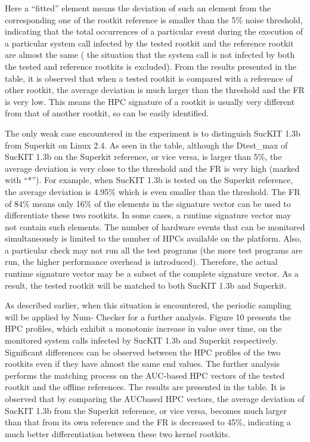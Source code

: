 \documentclass[12pt]{report}
\begin{document}
Here a “fitted” element means the deviation of such an
element from the corresponding one of the rootkit reference is
smaller than the 5\% noise threshold, indicating that the total
occurrences of a particular event during the execution of a
particular system call infected by the tested rootkit and the
reference rootkit are almost the same ( the situation
that the system call is not infected by both the tested and
reference rootkits is excluded). From the results presented in the table, it is observed  that when a tested rootkit is compared with a reference
of other rootkit, the average deviation is much larger than
the threshold and the FR is very low. This means the HPC
signature of a rootkit is usually very different from that of
another rootkit, so can be easily identified.

The only weak case encountered in the experiment is
to distinguish SucKIT 1.3b from Superkit on Linux 2.4.
As seen in the table, although the Dtest\_max of SucKIT
1.3b on the Superkit reference, or vice versa, is larger than
5\%, the average deviation is very close to the threshold and
the FR is very high (marked with “*”). For example, when
SucKIT 1.3b is tested on the Superkit reference, the average
deviation is 4.95\% which is even smaller than the threshold.
The FR of 84\% means only 16\% of the elements in the
signature vector can be used to differentiate these two rootkits.
In some cases, a runtime signature vector may not contain
such elements. The number of hardware events that can be
monitored simultaneously is limited to the number of HPCs
available on the platform. Also, a particular check may not
run all the test programs (the more test programs are run,
the higher performance overhead is introduced). Therefore,
the actual runtime signature vector may be a subset of the
complete signature vector. As a result, the tested rootkit will
be matched to both SucKIT 1.3b and Superkit.

As described earlier, when this situation is
encountered, the periodic sampling will be applied by Num-
Checker for a further analysis. Figure 10 presents the HPC
profiles, which exhibit a monotonic increase in value over
time, on the monitored system calls infected by SucKIT
1.3b and Superkit respectively. Significant differences can be
observed between the HPC profiles of the two rootkits even
if they have almost the same end values. The further analysis
performs the matching process on the AUC-based HPC vectors
of the tested rootkit and the offline references. The results are
presented in the table. It is observed that by comparing the AUCbased
HPC vectors, the average deviation of SucKIT 1.3b from
the Superkit reference, or vice versa, becomes much larger
than that from its own reference and the FR is decreased to
45\%, indicating a much better differentiation between these
two kernel rootkits.
\end{document}
